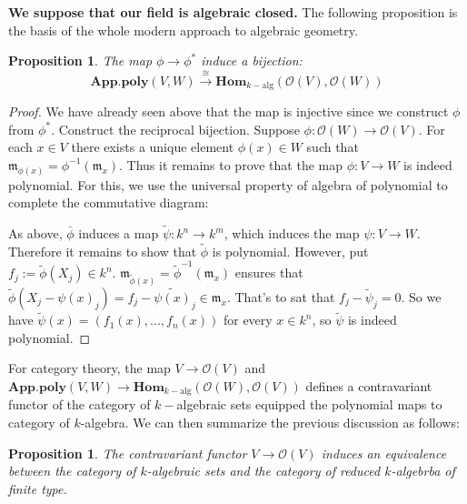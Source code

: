 \documentclass[12pt,a4paper,english]{article}
\theoremstyle{plain}
\newtheorem{prop}[thm]{Proposition}
\theoremstyle{definition}
\theoremstyle{remark}
\newcommand{\homo}{\mathbf{Hom}}
\begin{document}
\textbf{We suppose that our field is algebraic closed.} The following proposition is the basis of the whole modern approach to algebraic geometry.
\begin{prop}\label{prop1.5.2}
The map $\phi\rightarrow\phi^{*}$ induce a bijection:
\begin{equation*}
    \textbf{App.poly}(V,W)\xrightarrow{\cong}\homo_{k-\text{alg}}(\mathcal{O}(V),\mathcal{O}(W))
\end{equation*}
\end{prop}
\begin{proof}
We have already seen above that the map is injective since we construct $\phi$ from $\phi^{*}$. Construct the reciprocal bijection. Suppose $\phi:\mathcal{O}(W)\rightarrow \mathcal{O}(V)$. For each $x\in V$ there exists a unique element $\phi(x)\in W$ such that $\mathfrak{m}_{\phi(x)}=\phi^{-1}(\mathfrak{m}_{x})$. Thus it remains to prove that the map $\phi: V\rightarrow W$ is indeed polynomial. For this, we use the universal property  of algebra of polynomial to complete the commutative diagram:

\begin{center}
\end{center}
As above, $\bar{\phi}$ induces a map $\tilde{\psi}:k^{n}\rightarrow k^{m}$, which induces the map $\psi:V\rightarrow W$. Therefore it remains to show that $\tilde{\phi}$ is polynomial. However, put $f_{j}:=\tilde{\phi}(X_{j})\in k^{n}$. $\mathfrak{m}_{\tilde{\phi}(x)}=\tilde{\phi}^{-1}(\mathfrak{m}_{x})$ ensures that $\tilde{\phi}(X_{j}-\psi(x)_{j})=f_{j}-\tilde{\psi(x)}_{j}\in \mathfrak{m}_{x}$. That's to sat that $f_{j}-\tilde{\psi}_{j}=0$. So we have $\tilde{\psi}(x)=(f_{1}(x),...,f_{n}(x))$ for every $x\in k^{n}$, so $\tilde{\psi}$ is indeed polynomial.
\end{proof}
For category theory, the map $V\rightarrow\mathcal{O}(V)$ and $\textbf{App.poly}(V, W)\rightarrow \homo_{k-\text{alg}}(\mathcal{O}(W),\mathcal{O}(V))$ defines a contravariant functor of the category of $k-$algebraic sets equipped the polynomial maps to category of $k$-algebra. We can then summarize the previous discussion as follows:
\begin{prop}
The contravariant functor $V\rightarrow\mathcal{O}(V)$ induces an equivalence between the category of $k$-algebraic sets and the category of reduced $k$-algebrba of finite type.
\end{prop}
\end{document}
